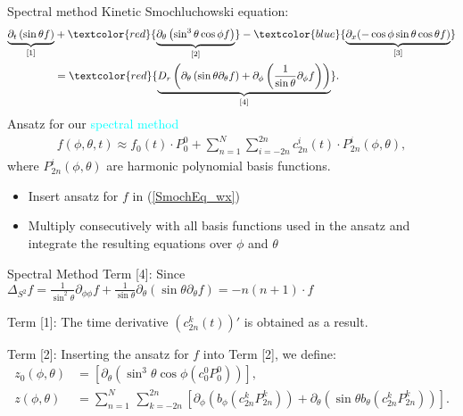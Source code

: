 
\begin{frame}{Spectral method}
	\scriptsize
	Kinetic Smochluchowski equation:
	\begin{align}
		\underbrace{\partial_{t}\left(\sin \theta f\right)}_{[1]} &+ \textcolor{red}{\underbrace{\partial_\theta\left( \sin ^3 \theta \cos \phi f\right)}_{[2]}} - \textcolor{blue}{\underbrace{\partial_x(-\cos\phi \sin\theta \cos\theta f)}_{[3]}} \nonumber \\ 
		&= \textcolor{red}{\underbrace{D_{r}\left(\partial_\theta \left(\sin \theta \partial_\theta f\right)+ \partial_\phi\left(\frac{1}{\sin \theta} \partial_\phi f\right)\right)}_{[4]}}. \label{SmochEq_wx}
	\end{align}	
  Ansatz for our \textcolor{cyan}{spectral method}
 \begin{align}
 	f(\phi, \theta, t) \approx f_0(t) \cdot P_0^0 + \sum_{n=1}^{N} \sum_{i=-2n}^{2n} c^i_{2n}(t) \cdot P^i_{2n}(\phi, \theta), \label{ansatz}
 \end{align}
 where $P^i_{2n}(\phi, \theta)$ are harmonic polynomial basis functions. 
	\vspace{12pt}
	\begin{itemize}
		\item Insert ansatz for $f$ in (\ref{SmochEq_wx}) 
		\item Multiply consecutively with all basis functions used in the ansatz and integrate the resulting equations over $\phi$ and $\theta$
	\end{itemize}
\end{frame}

\begin{frame}{Spectral Method}
	\scriptsize	
	Term [4]: Since $\Delta_{S^2} f = \frac{1}{\sin ^2 \theta} \partial_{\phi \phi} f + \frac{1}{\sin \theta} \partial_\theta\left(\sin \theta \partial_\theta f\right)= -n(n+1) \cdot f$
	
	Term [1]: The time derivative $(c^k_{2n}(t))'$ is obtained as a result.
	
	Term [2]: Inserting the ansatz for $f$ into Term [2], we define:
	\begin{align}
		z_0(\phi, \theta) &= \left[\partial_\theta( \sin ^3 \theta \cos \phi (c^0_0 P^0_0))\right], \\
		z(\phi, \theta) &= \sum_{n = 1}^{N} \, \sum_{k=-2n}^{2n} \left[\partial_\phi (b_\phi (c^k_{2n} P^{k}_{2n})) + \partial_\theta(\sin \theta b_\theta (c^k_{2n} P^{k}_{2n}))\right]. \label{smoch_ansatz}
	\end{align}
\end{frame}



